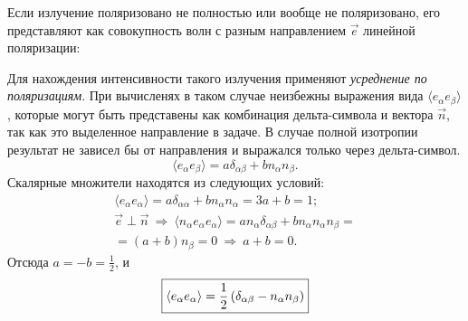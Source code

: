     Если излучение поляризовано не полностью или вообще не поляризовано, его представляют как совокупность волн с
    разным направлением $\vec{e}$ линейной поляризации:
    \begin{figure}[h]
        \centering{
            
        }
    \end{figure}
    Для нахождения интенсивности такого излучения применяют \textit{усреднение по поляризациям}. При вычисленях в таком случае
    неизбежны выражения вида  $\langle e_{\alpha}e_{\beta}\rangle$, которые могут быть представены как комбинация дельта-символа
    и вектора $\vec{n}$, так как это выделенное направление в задаче. В случае полной изотропии результат не зависел бы от направления
    и выражался только через дельта-символ.
    \[
        \langle e_{\alpha}e_{\beta}\rangle = a\delta_{\alpha\beta} + bn_{\alpha}n_{\beta}.
    \]
    Скалярные множители находятся из следующих условий:
    \begin{gather*}
        \langle e_{\alpha}e_{\alpha}\rangle = a\delta_{\alpha\alpha} + bn_{\alpha}n_{\alpha} = 3a+b = 1;\\
        \vec{e} \perp \vec{n} \: \Rightarrow \: \langle n_{\alpha} e_{\alpha}e_{\alpha}\rangle =
        an_{\alpha}\delta_{\alpha\beta} + bn_{\alpha}n_{\alpha}n_{\beta} = \\ =
        (a + b)n_{\beta} = 0 \: \Rightarrow \: a+b = 0.
    \end{gather*}
    Отсюда $a = -b = \frac{1}{2}$, и
    \[
        \boxed{\langle e_{\alpha}e_{\alpha}\rangle = \frac{1}{2} \left({\delta_{\alpha\beta} - n_{\alpha}n_{\beta}}\right)}
    \]